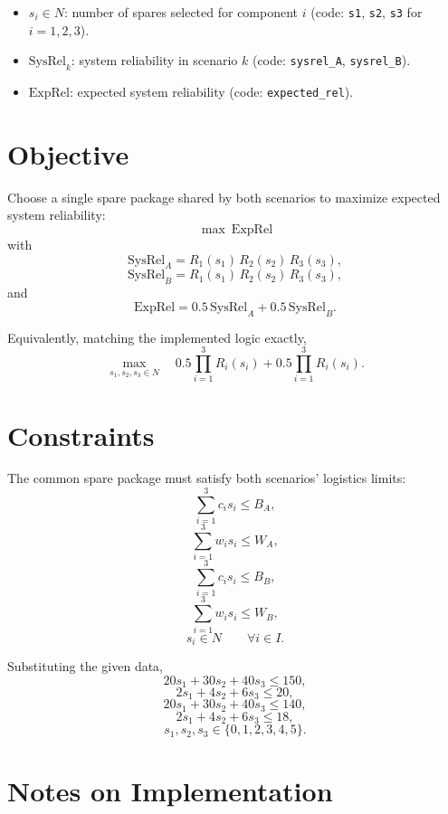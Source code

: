 \begin{itemize}
    \item $s_i \in N$: number of spares selected for component $i$ (code: \texttt{s1}, \texttt{s2}, \texttt{s3} for $i=1,2,3$).
    \item $\mathrm{SysRel}_k$: system reliability in scenario $k$ (code: \texttt{sysrel\_A}, \texttt{sysrel\_B}).
    \item $\mathrm{ExpRel}$: expected system reliability (code: \texttt{expected\_rel}).
\end{itemize}

\section*{Objective}

Choose a single spare package shared by both scenarios to maximize expected system reliability:
\[
\max \ \mathrm{ExpRel}
\]
with
\[
\mathrm{SysRel}_A = R_1(s_1)\,R_2(s_2)\,R_3(s_3),
\]
\[
\mathrm{SysRel}_B = R_1(s_1)\,R_2(s_2)\,R_3(s_3),
\]
and
\[
\mathrm{ExpRel} = 0.5\,\mathrm{SysRel}_A + 0.5\,\mathrm{SysRel}_B.
\]

Equivalently, matching the implemented logic exactly,
\[
\max_{s_1,s_2,s_3 \in N}
\quad
0.5\prod_{i=1}^3 R_i(s_i) + 0.5\prod_{i=1}^3 R_i(s_i).
\]

\section*{Constraints}

The common spare package must satisfy both scenarios' logistics limits:
\[
\sum_{i=1}^3 c_i s_i \le B_A,
\]
\[
\sum_{i=1}^3 w_i s_i \le W_A,
\]
\[
\sum_{i=1}^3 c_i s_i \le B_B,
\]
\[
\sum_{i=1}^3 w_i s_i \le W_B,
\]
\[
s_i \in N \qquad \forall i \in I.
\]

Substituting the given data,
\[
20 s_1 + 30 s_2 + 40 s_3 \le 150,
\]
\[
2 s_1 + 4 s_2 + 6 s_3 \le 20,
\]
\[
20 s_1 + 30 s_2 + 40 s_3 \le 140,
\]
\[
2 s_1 + 4 s_2 + 6 s_3 \le 18,
\]
\[
s_1,s_2,s_3 \in \{0,1,2,3,4,5\}.
\]

\section*{Notes on Implementation}

